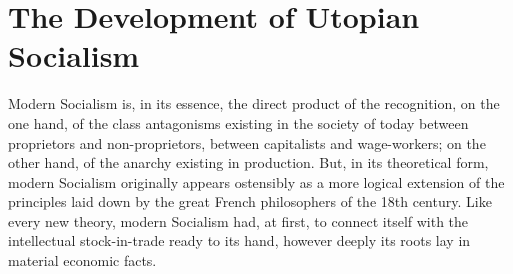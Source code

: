 \chapter{The Development of Utopian Socialism}

Modern Socialism is, in its essence, the direct product of the recognition, on
the one hand, of the class antagonisms existing in the society of today between
proprietors and non-proprietors, between capitalists and wage-workers; on the
other hand, of the anarchy existing in production. But, in its theoretical form,
modern Socialism originally appears ostensibly as a more logical extension of
the principles laid down by the great French philosophers of the 18th century.
Like every new theory, modern Socialism had, at first, to connect itself with
the intellectual stock-in-trade ready to its hand, however deeply its roots lay
in material economic facts.

